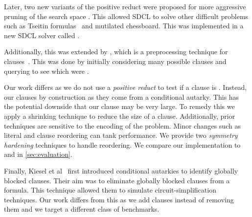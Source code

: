 Later, two new variants of the positive reduct were proposed for more aggressive pruning of the search space \cite{sadical}. This allowed SDCL to solve other difficult problems such as Tseitin formulas~\cite{hardexamplesresolution} and mutilated chessboard. This was implemented in a new SDCL solver called \sadical.


Additionally, this was extended by \prelearn, which is a preprocessing technique for \pr clauses~\cite{prelearn}. This was done by initially considering many possible clauses and querying \sadical to see which were \pr.

Our work differs as we do not use a \emph{positive reduct} to test if a clause is \pr. Instead, our clauses \pr by construction as they come from a conditional autarky. This has the potential downside that our clause may be very large. To remedy this we apply a shrinking technique to reduce the size of a clause. Additionally, prior techniques are sensitive to the encoding of the problem. Minor changes such as literal and clause reordering can tank performance. We provide two \emph{symmetry hardening} techniques to handle reordering. We compare our implementation \tool to \sadical and \prelearn in \autoref{sec:evaluation}.

Finally, Kiesel et al~\cite{conditionalautarkies} first introduced conditional autarkies to identify globally blocked clauses. Their aim was to eliminate globally blocked clauses from a formula. This technique allowed them to simulate circuit-simplification techniques. Our work differs from this as we add clauses instead of removing them and we target a different class of benchmarks.
